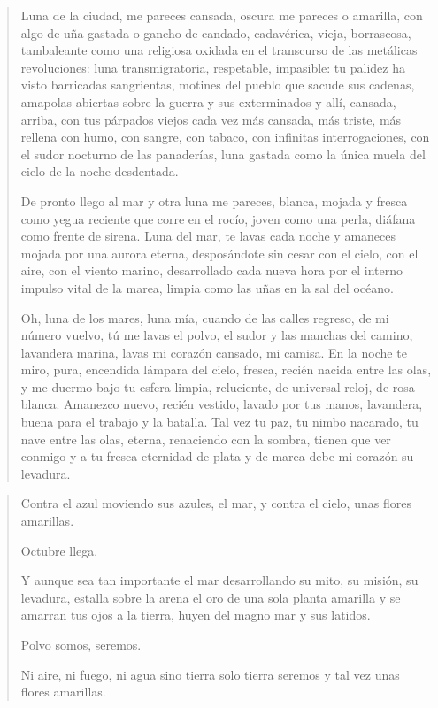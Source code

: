 \documentclass[12pt]{article}
\begin{document}
\clearpage
{}
\begin{verse}
Luna  
de la ciudad,  
me pareces  
cansada,  
oscura  
me pareces  
o amarilla,  
con algo  
de uña gastada  
o gancho de candado,  
cadavérica,  
vieja,  
borrascosa,  
tambaleante  
como una  
religiosa oxidada  
en el transcurso  
de las metálicas  
revoluciones:  
luna  
transmigratoria,  
respetable,  
impasible:  
tu  
palidez  
ha visto  
barricadas  
sangrientas,  
motines  
del pueblo que sacude  
sus cadenas,  
amapolas  
abiertas  
sobre  
la guerra  
y sus  
exterminados  
y allí, cansada, arriba,  
con tus párpados viejos  
cada vez  
más cansada,  
más  
triste,  
más rellena con humo,  
con sangre, con tabaco,  
con infinitas interrogaciones,  
con el sudor nocturno  
de las panaderías,  
luna  
gastada  
como  
la única muela  
del cielo  
de la noche  
desdentada.  

De pronto  
llego  
al mar  
y otra luna  
me pareces,  
blanca,  
mojada  
y fresca  
como  
yegua  
reciente  
que corre  
en el rocío,  
joven  
como una perla,  
diáfana  
como frente  
de sirena.  
Luna  
del mar,  
te lavas  
cada noche  
y amaneces  
mojada  
por una aurora eterna,  
desposándote  
sin cesar con el cielo, con el aire,  
con el viento marino,  
desarrollado cada  
nueva hora  
por el interno impulso  
vital de la marea,  
limpia como las uñas  
en la sal  
del océano.  

Oh, luna de los mares,  
luna  
mía,  
cuando  
de las calles  
regreso,  
de mi número  
vuelvo,  
tú me lavas  
el polvo,  
el sudor  
y las manchas  
del camino,  
lavandera  
marina,  
lavas  
mi corazón cansado,  
mi camisa.  
En la noche  
te miro,  
pura,  
encendida  
lámpara  
del cielo,  
fresca, recién nacida  
entre las olas,  
y me duermo  
bajo tu esfera limpia,  
reluciente,  
de universal reloj,  
de rosa blanca.  
Amanezco  
nuevo, recién vestido,  
lavado por tus manos,  
lavandera,  
buena para el trabajo  
y la batalla.  
Tal vez tu paz, tu nimbo  
nacarado,  
tu nave  
entre las olas,  
eterna, renaciendo  
con la sombra,  
tienen que ver conmigo  
y a tu fresca  
eternidad de plata  
y de marea  
debe mi corazón  
su levadura.  

\end{verse}

\clearpage
{}
\begin{verse}
Contra el azul moviendo sus azules,  
el mar, y contra el cielo,  
unas flores amarillas.  

Octubre llega.  

Y aunque sea  
tan importante el mar desarrollando  
su mito, su misión, su levadura,  
estalla  
sobre la arena el oro  
de una sola  
planta amarilla  
y se amarran  
tus ojos  
a la tierra,  
huyen del magno mar y sus latidos.  

Polvo somos, seremos.  

Ni aire, ni fuego, ni agua  
sino  
tierra  
solo tierra  
seremos  
y tal vez  
unas flores amarillas.  

\end{verse}
\end{document}
